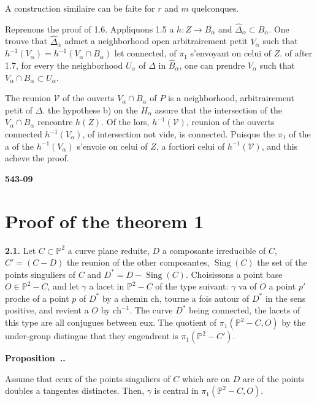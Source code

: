 \documentclass[12pt,a4paper]{article}
\newcounter{secitem}
\renewcommand{\thesecitem}{\thesection.\arabic{secitem}}
\newenvironment{secproposition}{%
  \refstepcounter{secitem}%
  \par\medskip\noindent\textbf{Proposition~\thesecitem.}~\ignorespaces
}{\par\medskip}
\DeclareMathOperator{\Sing}{Sing}
\begin{document}
A construction similaire can be faite for $r$ and $m$ quelconques.

Reprenons the proof of 1.6. Appliquons 1.5 a $h : Z \to \widehat{B}_\alpha$ and $\widehat{\Delta}_\alpha \subset \widehat{B}_\alpha$. One trouve that $\widehat{\Delta}_\alpha$ admet a neighborhood open arbitrairement petit $V_\alpha$ such that $h^{-1}(V_\alpha) = h^{-1}(V_\alpha \cap B_\alpha)$ let connected, of $\pi_1$ s'envoyant on celui of $Z$. of after 1.7, for every the neighborhood $U_\alpha$ of $\widehat{\Delta}$ in $\widehat{B}_\alpha$, one can prendre $V_\alpha$ such that $V_\alpha \cap B_\alpha \subset U_\alpha$.

The reunion $\mathcal{V}$ of the ouverts $V_\alpha \cap B_\alpha$ of $P$ is a neighborhood, arbitrairement petit of $\Delta$. the hypothese b) on the $H_\alpha$ assure that the intersection of the $V_\alpha \cap B_\alpha$ rencontre $h(Z)$. Of the lors, $h^{-1}(\mathcal{V})$, reunion of the ouverts connected $h^{-1}(V_\alpha)$, of intersection not vide, is connected. Puisque the $\pi_1$ of the a of the $h^{-1}(V_\alpha)$ s'envoie on celui of $Z$, a fortiori celui of $h^{-1}(\mathcal{V})$, and this acheve the proof.

\newpage
\begin{flushright}
\textbf{543-09}
\end{flushright}

\section{Proof of the theorem 1}
\setcounter{secitem}{0}

\textbf{2.1.} Let $C \subset \mathbb{P}^2$ a curve plane reduite, $D$ a composante irreducible of $C$, $C' = (C - D)$ the reunion of the other composantes, $\Sing(C)$ the set of the points singuliers of $C$ and $D^* = D - \Sing(C)$. Choisissons a point base $O \in \mathbb{P}^2 - C$, and let $\gamma$ a lacet in $\mathbb{P}^2 - C$ of the type suivant: $\gamma$ va of $O$ a point $p'$ proche of a point $p$ of $D^*$ by a chemin $\mathrm{ch}$, tourne a fois autour of $D^*$ in the sens positive, and revient a $O$ by $\mathrm{ch}^{-1}$. The curve $D^*$ being connected, the lacets of this type are all conjugues between eux. The quotient of $\pi_1(\mathbb{P}^2 - C, O)$ by the under-group distingue that they engendrent is $\pi_1(\mathbb{P}^2 - C')$.

\setcounter{secitem}{1}
\begin{secproposition}
Assume that ceux of the points singuliers of $C$ which are on $D$ are of the points doubles a tangentes distinctes. Then, $\gamma$ is central in $\pi_1(\mathbb{P}^2 - C, O)$.
\end{secproposition}
\end{document}
